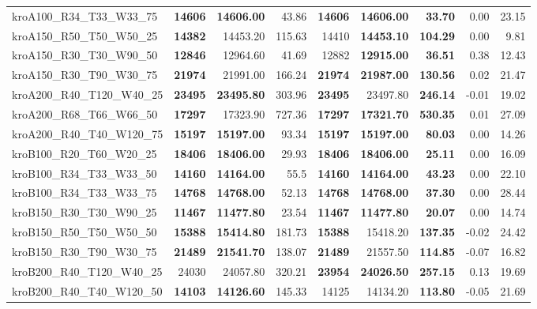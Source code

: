 \documentclass{singlecol-new}
\begin{document}
{\begin{longtable}{lrrrrrrrr}
		kroA100\_R34\_T33\_W33\_75 & \textbf{14606} & \textbf{14606.00} & 43.86 & \textbf{14606} & \textbf{14606.00} & \textbf{33.70} & 0.00 & 23.15 \\
		kroA150\_R50\_T50\_W50\_25 & \textbf{14382} & 14453.20 & 115.63 & 14410 & \textbf{14453.10} & \textbf{104.29} & 0.00 & 9.81 \\
		kroA150\_R30\_T30\_W90\_50 & \textbf{12846} & 12964.60 & 41.69 & 12882 & \textbf{12915.00} & \textbf{36.51} & 0.38 & 12.43 \\
		kroA150\_R30\_T90\_W30\_75 & \textbf{21974} & 21991.00 & 166.24 & \textbf{21974} & \textbf{21987.00} & \textbf{130.56} & 0.02 & 21.47 \\
		kroA200\_R40\_T120\_W40\_25 & \textbf{23495} & \textbf{23495.80} & 303.96 & \textbf{23495} & 23497.80 & \textbf{246.14} & -0.01 & 19.02 \\
		kroA200\_R68\_T66\_W66\_50 & \textbf{17297} & 17323.90 & 727.36 & \textbf{17297} & \textbf{17321.70} & \textbf{530.35} & 0.01 & 27.09 \\
		kroA200\_R40\_T40\_W120\_75 & \textbf{15197} & \textbf{15197.00} & 93.34 & \textbf{15197} & \textbf{15197.00} & \textbf{80.03} & 0.00 & 14.26 \\
		kroB100\_R20\_T60\_W20\_25 & \textbf{18406} & \textbf{18406.00} & 29.93 & \textbf{18406} & \textbf{18406.00} & \textbf{25.11} & 0.00 & 16.09 \\
		kroB100\_R34\_T33\_W33\_50 & \textbf{14160} & \textbf{14164.00} & 55.5 & \textbf{14160} & \textbf{14164.00} & \textbf{43.23} & 0.00 & 22.10 \\
		kroB100\_R34\_T33\_W33\_75 & \textbf{14768} & \textbf{14768.00} & 52.13 & \textbf{14768} & \textbf{14768.00} & \textbf{37.30} & 0.00 & 28.44 \\
		kroB150\_R30\_T30\_W90\_25 & \textbf{11467} & \textbf{11477.80} & 23.54 & \textbf{11467} & \textbf{11477.80} & \textbf{20.07} & 0.00 & 14.74 \\
		kroB150\_R50\_T50\_W50\_50 & \textbf{15388} & \textbf{15414.80} & 181.73 & \textbf{15388} & 15418.20 & \textbf{137.35} & -0.02 & 24.42 \\
		kroB150\_R30\_T90\_W30\_75 & \textbf{21489} & \textbf{21541.70} & 138.07 & \textbf{21489} & 21557.50 & \textbf{114.85} & -0.07 & 16.82 \\
		kroB200\_R40\_T120\_W40\_25 & 24030 & 24057.80 & 320.21 & \textbf{23954} & \textbf{24026.50} & \textbf{257.15} & 0.13 & 19.69 \\
		kroB200\_R40\_T40\_W120\_50 & \textbf{14103} & \textbf{14126.60} & 145.33 & 14125 & 14134.20 & \textbf{113.80} & -0.05 & 21.69 \\

\end{longtable}}
\end{document}
